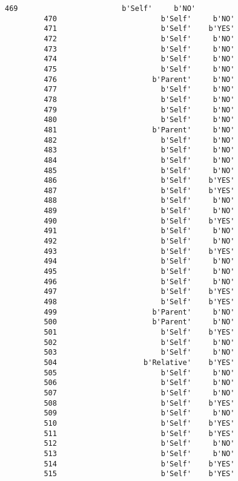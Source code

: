 \documentclass[11pt]{article}
\begin{document}
\begin{Verbatim}[commandchars=\\\{\}]
         469                        b'Self'     b'NO'  
         470                        b'Self'     b'NO'  
         471                        b'Self'    b'YES'  
         472                        b'Self'     b'NO'  
         473                        b'Self'     b'NO'  
         474                        b'Self'     b'NO'  
         475                        b'Self'     b'NO'  
         476                      b'Parent'     b'NO'  
         477                        b'Self'     b'NO'  
         478                        b'Self'     b'NO'  
         479                        b'Self'     b'NO'  
         480                        b'Self'     b'NO'  
         481                      b'Parent'     b'NO'  
         482                        b'Self'     b'NO'  
         483                        b'Self'     b'NO'  
         484                        b'Self'     b'NO'  
         485                        b'Self'     b'NO'  
         486                        b'Self'    b'YES'  
         487                        b'Self'    b'YES'  
         488                        b'Self'     b'NO'  
         489                        b'Self'     b'NO'  
         490                        b'Self'    b'YES'  
         491                        b'Self'     b'NO'  
         492                        b'Self'     b'NO'  
         493                        b'Self'    b'YES'  
         494                        b'Self'     b'NO'  
         495                        b'Self'     b'NO'  
         496                        b'Self'     b'NO'  
         497                        b'Self'    b'YES'  
         498                        b'Self'    b'YES'  
         499                      b'Parent'     b'NO'  
         500                      b'Parent'     b'NO'  
         501                        b'Self'    b'YES'  
         502                        b'Self'     b'NO'  
         503                        b'Self'     b'NO'  
         504                    b'Relative'    b'YES'  
         505                        b'Self'     b'NO'  
         506                        b'Self'     b'NO'  
         507                        b'Self'     b'NO'  
         508                        b'Self'    b'YES'  
         509                        b'Self'     b'NO'  
         510                        b'Self'    b'YES'  
         511                        b'Self'    b'YES'  
         512                        b'Self'     b'NO'  
         513                        b'Self'     b'NO'  
         514                        b'Self'    b'YES'  
         515                        b'Self'    b'YES'  

\end{Verbatim}
\end{document}
